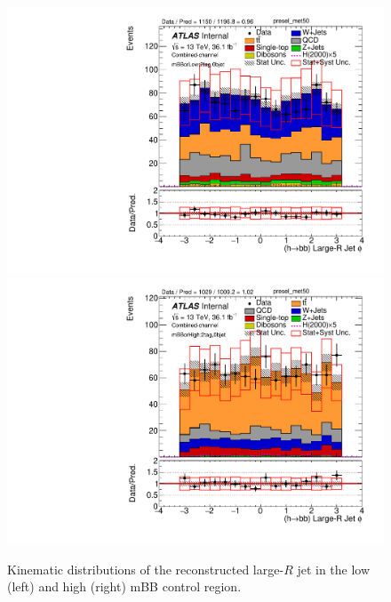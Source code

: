 \begin{figure}[!h]
\begin{center}
\includegraphics[scale=0.33]{./figures/boosted/PlotByMbbRegions/DataMC_2tag_0bjet_mbbcrLow_lepton_presel_met50_HbbPhi} 
\includegraphics[scale=0.33]{./figures/boosted/PlotByMbbRegions/DataMC_2tag_0bjet_mbbcrHigh_lepton_presel_met50_HbbPhi}                                                                             
\caption{Kinematic distributions of the reconstructed large-$R$ jet in the low (left) and high (right) mBB control region.}
\label{fig:boosted_mbbcrHighLow_largerjet}
\end{center}
\end{figure}

